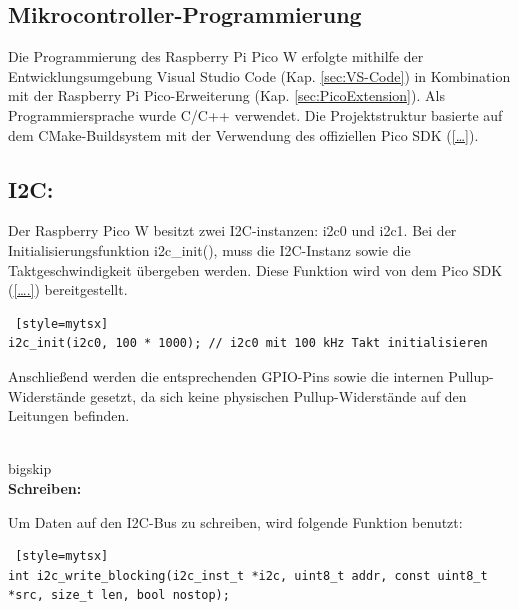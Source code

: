 \begin{inhalt}
\renewcommand*\chapterpagestyle{scrheadings}

\chapter{Mikrocontroller-Programmierung} \label{sec:Mikrocontroller-Programmierung}

Die Programmierung des Raspberry Pi Pico W erfolgte mithilfe der Entwicklungsumgebung Visual Studio Code (Kap. \ref{sec:VS-Code}) in Kombination mit der Raspberry Pi Pico-Erweiterung (Kap. \ref{sec:PicoExtension}). Als Programmiersprache wurde C/C++ verwendet. Die Projektstruktur basierte auf dem CMake-Buildsystem mit der Verwendung des offiziellen Pico SDK (\ref{…}). 

\section{I2C:} \label{I2C_Programmierung}

Der Raspberry Pico W besitzt zwei I2C-instanzen: i2c0 und i2c1. Bei der Initialisierungsfunktion i2c\_init(), muss die I2C-Instanz sowie die Taktgeschwindigkeit übergeben werden. Diese Funktion wird von dem Pico SDK (\ref{….}) bereitgestellt. 

\begin{lstlisting} [style=mytsx]
i2c_init(i2c0, 100 * 1000); // i2c0 mit 100 kHz Takt initialisieren
\end{lstlisting}


Anschließend werden die entsprechenden GPIO-Pins sowie die internen Pullup-Widerstände gesetzt, da sich keine physischen Pullup-Widerstände auf den Leitungen befinden. 

\\bigskip \\


\textbf{Schreiben:}

Um Daten auf den I2C-Bus zu schreiben, wird folgende Funktion benutzt:

\begin{lstlisting} [style=mytsx]
int i2c_write_blocking(i2c_inst_t *i2c, uint8_t addr, const uint8_t *src, size_t len, bool nostop);
\end{lstlisting}


\end{inhalt}
